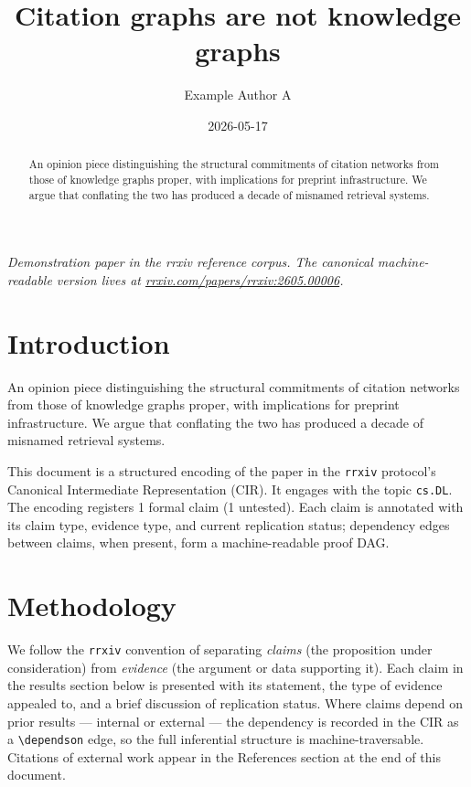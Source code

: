 \documentclass{rrxiv}
\title{Citation graphs are not knowledge graphs}
\author{Example Author A}
\date{2026-05-17}
\begin{document}
\maketitle

\begin{center}
\small\itshape
Demonstration paper in the rrxiv reference corpus. The canonical machine-readable version lives at \href{https://rrxiv.com/papers/rrxiv:2605.00006}{rrxiv.com/papers/rrxiv:2605.00006}.
\end{center}

\begin{abstract}
An opinion piece distinguishing the structural commitments of citation networks from those of knowledge graphs proper, with implications for preprint infrastructure. We argue that conflating the two has produced a decade of misnamed retrieval systems.
\end{abstract}

\section{Introduction}
An opinion piece distinguishing the structural commitments of citation networks from those of knowledge graphs proper, with implications for preprint infrastructure. We argue that conflating the two has produced a decade of misnamed retrieval systems.

This document is a structured encoding of the paper in the \texttt{rrxiv} protocol's Canonical Intermediate Representation (CIR). It engages with the topic \texttt{cs.DL}. The encoding registers 1 formal claim (1 untested). Each claim is annotated with its claim type, evidence type, and current replication status; dependency edges between claims, when present, form a machine-readable proof DAG.

\section{Methodology}
We follow the \texttt{rrxiv} convention of separating \emph{claims} (the proposition under consideration) from \emph{evidence} (the argument or data supporting it). Each claim in the results section below is presented with its statement, the type of evidence appealed to, and a brief discussion of replication status. Where claims depend on prior results --- internal or external --- the dependency is recorded in the CIR as a \texttt{\textbackslash dependson} edge, so the full inferential structure is machine-traversable. Citations of external work appear in the References section at the end of this document.
\end{document}
